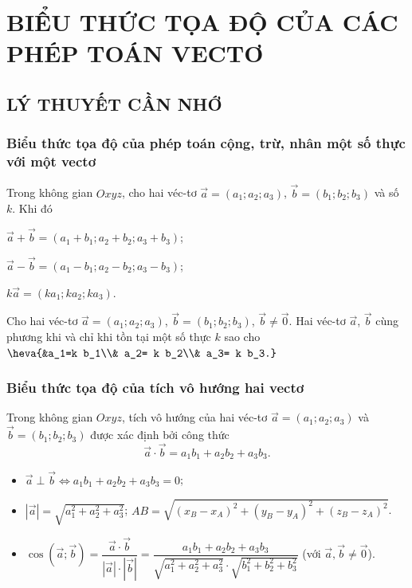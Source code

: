 \setcounter{section}{2}
\setcounter{dang}{0}
\section{BIỂU THỨC TỌA ĐỘ CỦA CÁC PHÉP TOÁN VECTƠ}
\subsection{LÝ THUYẾT CẦN NHỚ}
\subsubsection{Biểu thức tọa độ của phép toán cộng, trừ, nhân một số thực với một vectơ}
Trong không gian $Oxyz$, cho hai véc-tơ $\vec{a} = (a_1;a_2;a_3)$, $\vec{b} = (b_1; b_2; b_3)$ và số $k$. Khi đó
\begin{listEX}[1]
	\item [\ding{172}] $\vec{a}+\vec{b}=(a_1+b_1;a_2+b_2;a_3+b_3)$;
	\item [\ding{173}] $\vec{a}-\vec{b}=(a_1-b_1;a_2-b_2;a_3-b_3)$;
	\item [\ding{174}] $k\vec{a} = (ka_1; ka_2; ka_3)$.
\end{listEX}
\begin{note}
	Cho hai véc-tơ $\vec{a}=(a_1;a_2;a_3)$, $\vec{b}=(b_1;b_2;b_3)$, $\vec{b}\ne \vec{0}$. Hai véc-tơ $\vec{a}$, $\vec{b}$ cùng phương khi và chỉ khi tồn tại một số thực $k$ sao cho $\heva{&a_1=k b_1\\& a_2= k b_2\\& a_3= k b_3.}$
\end{note}
\subsubsection{Biểu thức tọa độ của tích vô hướng hai vectơ}
Trong không gian $Oxyz$, tích vô hướng của hai véc-tơ $\vec{a} = (a_1;a_2;a_3)$ và $\vec{b} = (b_1; b_2; b_3)$ được xác định bởi công thức
\[\vec{a} \cdot \vec{b} = a_1b_1 + a_2b_2 + a_3b_3. \]
\begin{note}
	\begin{itemize}
		\item[\ding{172}] $\vec{a} \perp \vec{b} \Leftrightarrow a_1b_1 + a_2b_2 + a_3b_3 = 0$;
		\item[\ding{173}] $\left| \vec{a} \right| = \sqrt{a_1^2 + a_2^2 +a_3^2}$; \quad $AB=\sqrt{(x_B-x_A)^2+(y_B-y_A)^2+(z_B-z_A)^2}$.
		\item[\ding{174}] $\cos \left(\vec{a}; \vec{b}\right) = \dfrac{\vec{a}\cdot \vec{b}}{\left|\vec{a}\right| \cdot \left|\vec{b}\right|} = \dfrac{a_1b_1 + a_2b_2 + a_3b_3}{\sqrt{a_1^2 + a_2^2 +a_3^2} \cdot \sqrt{b_1^2 + b_2^2 +b_3^2}}$ (với $\vec{a},\vec{b} \ne \vec{0}$).
	\end{itemize}
\end{note}

